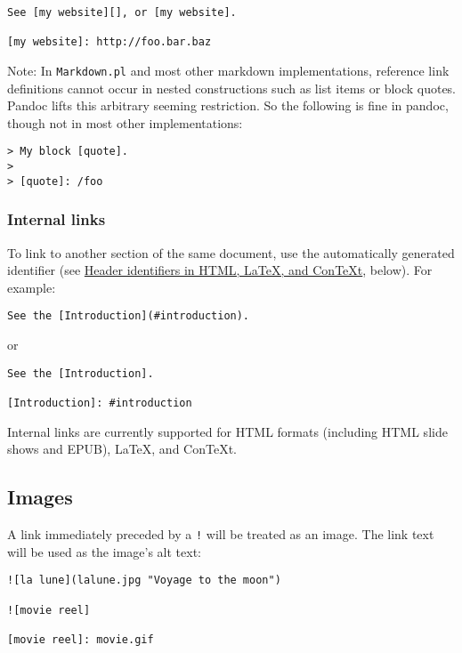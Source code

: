 \documentclass[]{article}
\begin{document}
\begin{verbatim}
See [my website][], or [my website].

[my website]: http://foo.bar.baz
\end{verbatim}

Note: In \texttt{Markdown.pl} and most other markdown implementations,
reference link definitions cannot occur in nested constructions such as
list items or block quotes. Pandoc lifts this arbitrary seeming
restriction. So the following is fine in pandoc, though not in most
other implementations:

\begin{verbatim}
> My block [quote].
>
> [quote]: /foo
\end{verbatim}

\subsubsection{Internal links}

To link to another section of the same document, use the automatically
generated identifier (see
\hyperref[header-identifiers-in-html-latex-and-context]{Header
identifiers in HTML, LaTeX, and ConTeXt}, below). For example:

\begin{verbatim}
See the [Introduction](#introduction).
\end{verbatim}

or

\begin{verbatim}
See the [Introduction].

[Introduction]: #introduction
\end{verbatim}

Internal links are currently supported for HTML formats (including HTML
slide shows and EPUB), LaTeX, and ConTeXt.

\subsection{Images}

A link immediately preceded by a \texttt{!} will be treated as an image.
The link text will be used as the image's alt text:

\begin{verbatim}
![la lune](lalune.jpg "Voyage to the moon")

![movie reel]

[movie reel]: movie.gif
\end{verbatim}
\end{document}
